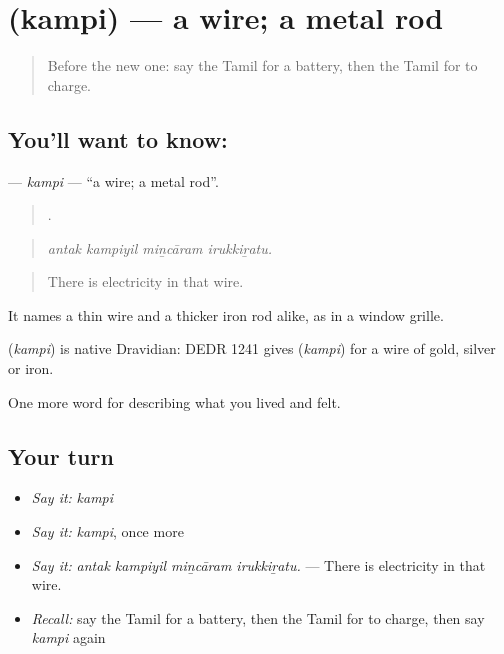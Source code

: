 \section[\texorpdfstring{\ta{கம்பி} (kampi)}{கம்பி (kampi)}]{ (kampi) — a wire; a metal rod}

\label{lesson:TA-C517-kampi}



\begin{quote}
Before the new one: say the Tamil for a battery, then the Tamil for to charge.
\end{quote}

\subsection*{You'll want to know: }
\textbf{} — \emph{kampi} — \textquotedblleft{}a wire; a metal rod\textquotedblright{}.

\begin{quote}
   .
\end{quote}

\begin{quote}
\emph{antak kampiyil miṉcāram irukkiṟatu.}
\end{quote}

\begin{quote}
There is electricity in that wire.
\end{quote}

It names a thin wire and a thicker iron rod alike, as in a window grille.

\begin{cousinweb}
\textbf{} (\emph{kampi}) is native Dravidian: DEDR 1241 gives  (\emph{kampi}) for a wire of gold, silver or iron.
\end{cousinweb}

\begin{grammarlens}[title={What you've built}]
One more word for describing what you lived and felt.
\end{grammarlens}

\subsection*{Your turn}
\begin{itemize}
\raggedright
  \item \emph{Say it:} \emph{kampi}
  \item \emph{Say it:} \emph{kampi}, once more
  \item \emph{Say it:} \emph{antak kampiyil miṉcāram irukkiṟatu.} — There is electricity in that wire.
  \item \emph{Recall:} say the Tamil for a battery, then the Tamil for to charge, then say \emph{kampi} again
\end{itemize}

